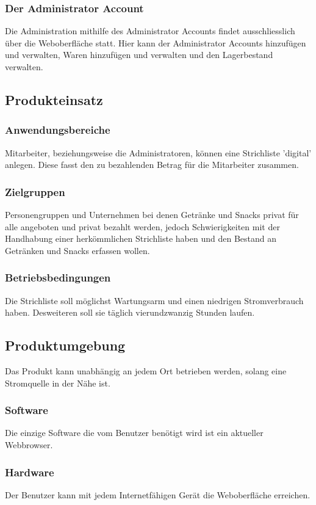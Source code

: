 \documentclass[11pt,a4paper]{article} %
\begin{document}
\subsubsection{Der Administrator Account}
Die Administration mithilfe des Administrator Accounts findet ausschliesslich über die Weboberfläche statt. Hier kann der Administrator Accounts hinzufügen und verwalten, Waren hinzuf\"ugen und verwalten und den Lagerbestand verwalten.

\subsection{Produkteinsatz}
\subsubsection{Anwendungsbereiche}
Mitarbeiter, beziehungsweise die Administratoren, können eine Strichliste 'digital' anlegen. Diese fasst den zu bezahlenden Betrag für die Mitarbeiter zusammen.

\subsubsection{Zielgruppen}
Personengruppen und Unternehmen bei denen Getränke und Snacks privat für alle angeboten und privat bezahlt werden, jedoch Schwierigkeiten mit der Handhabung einer herk\"ommlichen Strichliste haben und den Bestand an Getränken und Snacks erfassen wollen.

\subsubsection{Betriebsbedingungen}
Die Strichliste soll möglichst Wartungsarm und einen niedrigen Stromverbrauch haben. Desweiteren soll sie täglich vierundzwanzig Stunden laufen.

\subsection{Produktumgebung}
Das Produkt kann unabhängig an jedem Ort betrieben werden, solang eine Stromquelle in der Nähe ist.

\subsubsection{Software}
Die einzige Software die vom Benutzer benötigt wird ist ein aktueller Webbrowser.

\subsubsection{Hardware}
Der Benutzer kann mit jedem Internetfähigen Gerät die Weboberfläche erreichen.
\end{document}

